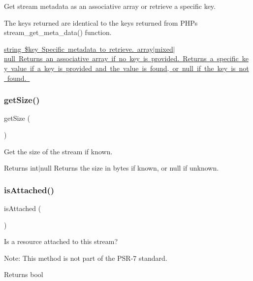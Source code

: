 Get stream metadata as an associative array or retrieve a specific key.

The keys returned are identical to the keys returned from P\+HP\textquotesingle{}s stream\+\_\+get\+\_\+meta\+\_\+data() function.

\mbox{\hyperlink{}{string \$key Specific metadata to retrieve.  array$\vert$mixed$\vert$null Returns an associative array if no key is provided. Returns a specific key value if a key is provided and the value is found, or null if the key is not found. }}\mbox{\label{class_pes_1_1_http_1_1_stream_a75cce10cdf81be6dc84881c28b3379b7}} 
\subsubsection{\texorpdfstring{get\+Size()}{getSize()}}
{\footnotesize\ttfamily get\+Size (\begin{DoxyParamCaption}{ }\end{DoxyParamCaption})}

Get the size of the stream if known.

\begin{DoxyReturn}{Returns}
int$\vert$null Returns the size in bytes if known, or null if unknown. 
\end{DoxyReturn}
\mbox{\label{class_pes_1_1_http_1_1_stream_a6e93873b04ab19cdf9827234a8d6d0de}} 
\subsubsection{\texorpdfstring{is\+Attached()}{isAttached()}}
{\footnotesize\ttfamily is\+Attached (\begin{DoxyParamCaption}{ }\end{DoxyParamCaption})\hspace{0.3cm}{\ttfamily [protected]}}

Is a resource attached to this stream?

Note\+: This method is not part of the P\+S\+R-\/7 standard.

\begin{DoxyReturn}{Returns}
bool 
\end{DoxyReturn}
\mbox{\label{class_pes_1_1_http_1_1_stream_a40c3664bb217c4922a289cc97e9cdceb}} 
